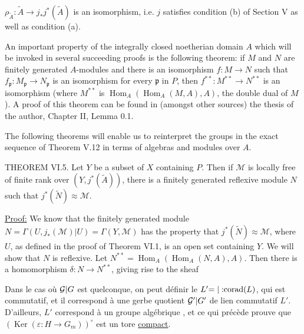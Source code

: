 
$\rho_{\widetilde A}:\widetilde A\longrightarrow j_*j^*(\widetilde A)$ is an isomorphism, i.e. $j$ satisfies condition (b) of Section V as well as condition (a).

An important property of the integrally closed noetherian domain $A$ which will be invoked in several succeeding proofs is the following theorem: if $M$ and $N$ are finitely generated $A$-modules and there is an isomorphism $f:M\longrightarrow N$ such that $f_{\mathfrak p}:M_{\mathfrak p}\longrightarrow N_{\mathfrak p}$ is an isomorphism for every $\mathfrak p$ in $P$, then $f^{**}:M^{**}\longrightarrow N^{**}$ is an isomorphism (where $M^{**}$ is $\operatorname{Hom}_A(\operatorname{Hom}_A(M,A),A)$, the double dual of $M$). A proof of this theorem can be found in (amongst other sources) the thesis of the author, Chapter II, Lemma 0.1.

The following theorems will enable us to reinterpret the groups in the exact sequence of Theorem V.12 in terms of algebras and modules over $A$.

THEOREM VI.5. Let $Y$ be a subset of $X$ containing $P$. Then if $\mathcal M$ is locally free of finite rank over $(Y,j^*(\widetilde A))$, there is a finitely generated reflexive module $N$ such that $j^*(\widetilde N)\approx\mathcal M$.

\uline{Proof:} We know that the finitely generated module $N=\Gamma(U,j_*(\mathcal M)|U)=\Gamma(Y,\mathcal M)$ has the property that $j^*(\widetilde N)\approx\mathcal M$, where $U$, as defined in the proof of Theorem VI.1, is an open set containing $Y$. We will show that $N$ is reflexive. Let $N^{**}=\operatorname{Hom}_A(\operatorname{Hom}_A(N,A),A)$. Then there is a homomorphism $\delta:N\longrightarrow N^{**}$, giving rise to the sheaf



Dans le cas où ${\mathcal G|G}$ est quelconque, on peut définir  le  $L'{=|:}{\operatorname{corad}}(L)$, qui est commutatif, et il correspond à une gerbe quotient ${\mathcal G'|G'}$ de lien commutatif $L'$. D'ailleurs, $L'$ correspond à un groupe algébrique , et ce qui précède prouve que $(\operatorname{Ker}(\varepsilon:H\longrightarrow G_m))^\circ$ est un tore \uline{compact}.


